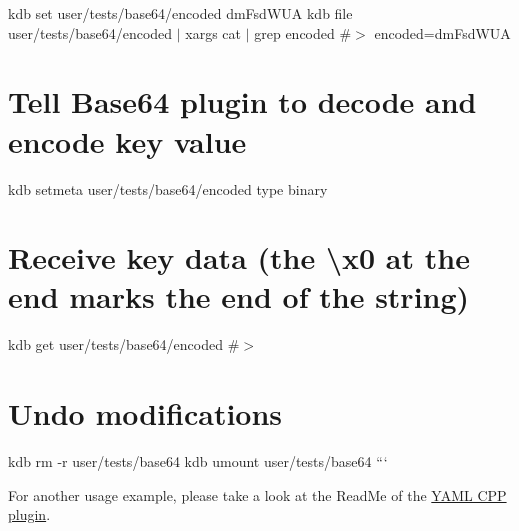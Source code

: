 kdb set user/tests/base64/encoded dm\+Fsd\+W\+UA kdb file user/tests/base64/encoded $\vert$ xargs cat $\vert$ grep encoded \#$>$ encoded=dm\+Fsd\+W\+UA

\section*{Tell Base64 plugin to decode and encode key value}

kdb setmeta user/tests/base64/encoded type binary

\section*{Receive key data (the {\ttfamily \textbackslash{}x0} at the end marks the end of the string)}

kdb get user/tests/base64/encoded \#$>$ 

\section*{Undo modifications}

kdb rm -\/r user/tests/base64 kdb umount user/tests/base64 ```

For another usage example, please take a look at the Read\+Me of the \hyperlink{md_src_plugins_yamlcpp_README_src_plugins_yamlcpp_README_md}{Y\+A\+ML C\+PP plugin}. 